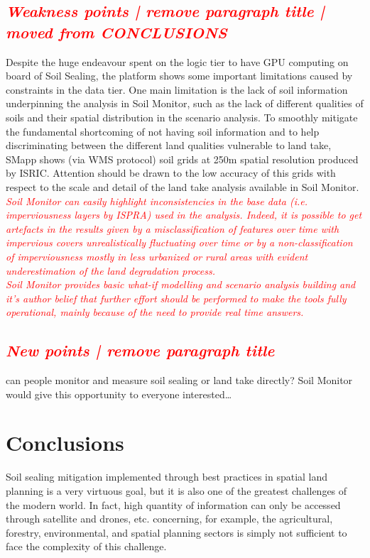 \documentclass[APA,LATO1COL,doublespace]{WileyNJD-v2}
\newcommand{\toberevised}[1]{\emph{\textcolor{red}{#1}}} %
\begin{document}
\subsection{ \toberevised{Weakness points | remove paragraph title | moved from CONCLUSIONS} }
Despite the huge endeavour spent on the logic tier to have GPU computing on board of Soil Sealing, the platform shows some important limitations caused by constraints in the data tier.
One main limitation is the lack of soil information underpinning the analysis in Soil Monitor, such as the lack of different qualities of soils and their spatial distribution in the scenario analysis.
To smoothly mitigate the fundamental shortcoming of not having soil information and to help discriminating between the different land qualities vulnerable to land take, SMapp shows (via WMS protocol) soil grids at 250m spatial resolution produced by ISRIC.
Attention should be drawn to the low accuracy of this grids with respect to the scale and detail of the land take analysis available in Soil Monitor.
\toberevised{
Soil Monitor can easily highlight inconsistencies in the base data (i.e. imperviousness layers by ISPRA) used in the analysis.
Indeed, it is possible to get artefacts in the results given by a misclassification of features over time with impervious covers unrealistically fluctuating over time or by a non-classification of imperviousness mostly in less urbanized or rural areas with evident underestimation of the land degradation process.\\
Soil Monitor provides basic \textit{what-if} modelling and scenario analysis building and it's author belief that further effort should be performed to make the tools fully operational, mainly because of the need to provide real time answers.
}

\subsection{ \toberevised{New points | remove paragraph title}}
 can people monitor and measure soil sealing or land take directly? Soil Monitor would give this opportunity to everyone interested\ldots



\section{Conclusions}
Soil sealing mitigation implemented through best practices in spatial land planning is a very virtuous goal, but it is also one of the greatest challenges of the modern world. 
In fact, high quantity of information can only be accessed through satellite and drones, etc. concerning, for example, the agricultural, forestry, environmental, and spatial planning sectors is simply not sufficient to face the complexity of this challenge.
\end{document}
